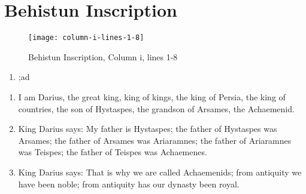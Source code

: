 \section{Behistun Inscription}

\begin{figure}[H]
    \texttt{[image: column-i-lines-1-8]}
    \caption{Behistun Inscription, Column i, lines 1-8\cite{BehistunT01}}
\end{figure}

\begin{enumerate}
    \item {\oldpersian ;ad}
\end{enumerate}

\begin{enumerate}
    \item I am Darius, the great king, king of kings, the king of Persia, the king of countries, the son of Hystaspes,
         the grandson of Arsames, the Achaemenid.
    \item King Darius says: My father is Hystaspes; the father of Hystaspes was Arsames; the father of Arsames was
          Ariaramnes; the father of Ariaramnes was Teispes; the father of Teispes was Achaemenes.
    \item King Darius says: That is why we are called Achaemenids; from antiquity we have been noble; from antiquity
          has our dynasty been royal.
\end{enumerate}
